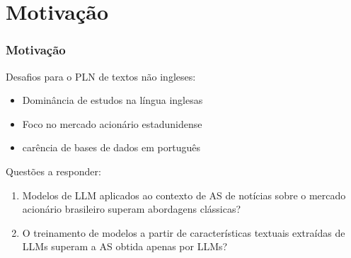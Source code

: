 \section{Motivação} %


\begin{frame}
	\frametitle{Motivação}
    Desafios para o PLN de textos não ingleses:
    \begin{itemize}
        \item Dominância de estudos na língua inglesas
        \item Foco no mercado acionário estadunidense
        \item carência de bases de dados em português
    \end{itemize}
	\bigskip
    Questões a responder:
    \begin{enumerate}
        \item Modelos de LLM aplicados ao contexto de AS de notícias sobre o mercado acionário brasileiro superam abordagens clássicas?
        \item O treinamento de modelos a partir de características textuais extraídas de LLMs superam a AS obtida apenas por LLMs?
    \end{enumerate}
\end{frame}

